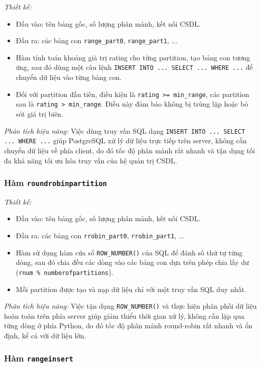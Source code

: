 \documentclass[14pt]{extarticle}
\begin{document}
\textit{Thiết kế:}
\begin{itemize}
    \item Đầu vào: tên bảng gốc, số lượng phân mảnh, kết nối CSDL.
    \item Đầu ra: các bảng con \texttt{range\_part0}, \texttt{range\_part1}, ...
    \item Hàm tính toán khoảng giá trị rating cho từng partition, tạo bảng con tương ứng, sau đó dùng một câu lệnh \texttt{INSERT INTO ... SELECT ... WHERE ...} để chuyển dữ liệu vào từng bảng con.
    \item Đối với partition đầu tiên, điều kiện là \texttt{rating >= min\_range}, các partition sau là \texttt{rating > min\_range}. Điều này đảm bảo không bị trùng lặp hoặc bỏ sót giá trị biên.
\end{itemize}
\textit{Phân tích hiệu năng:}  
Việc dùng truy vấn SQL dạng \texttt{INSERT INTO ... SELECT ... WHERE ...} giúp PostgreSQL xử lý dữ liệu trực tiếp trên server, không cần chuyển dữ liệu về phía client, do đó tốc độ phân mảnh rất nhanh và tận dụng tối đa khả năng tối ưu hóa truy vấn của hệ quản trị CSDL.


\subsubsection{Hàm \texttt{roundrobinpartition}}

\textit{Thiết kế:}
\begin{itemize}
    \item Đầu vào: tên bảng gốc, số lượng phân mảnh, kết nối CSDL.
    \item Đầu ra: các bảng con \texttt{rrobin\_part0}, \texttt{rrobin\_part1}, ...
    \item Hàm sử dụng hàm cửa sổ \texttt{ROW\_NUMBER()} của SQL để đánh số thứ tự từng dòng, sau đó chia đều các dòng vào các bảng con dựa trên phép chia lấy dư (\texttt{rnum \% numberofpartitions}).
    \item Mỗi partition được tạo và nạp dữ liệu chỉ với một truy vấn SQL duy nhất.
\end{itemize}
\textit{Phân tích hiệu năng:}  
Việc tận dụng \texttt{ROW\_NUMBER()} và thực hiện phân phối dữ liệu hoàn toàn trên phía server giúp giảm thiểu thời gian xử lý, không cần lặp qua từng dòng ở phía Python, do đó tốc độ phân mảnh round-robin rất nhanh và ổn định, kể cả với dữ liệu lớn.

\subsubsection{Hàm \texttt{rangeinsert}}
\end{document}
